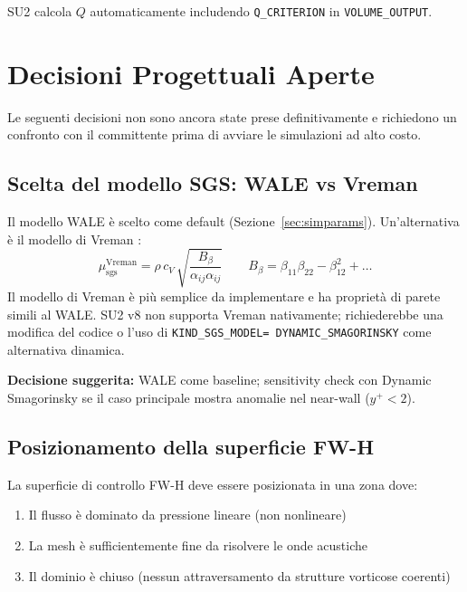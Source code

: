 \documentclass[11pt,a4paper]{article}
\newcommand{\ttcfg}[1]{\texttt{\color{codegray}#1}}
\begin{document}
SU2 calcola $Q$ automaticamente includendo \ttcfg{Q\_CRITERION} in \ttcfg{VOLUME\_OUTPUT}.

\section{Decisioni Progettuali Aperte}
\label{sec:decisioni}

Le seguenti decisioni non sono ancora state prese definitivamente e richiedono un confronto con il committente prima di avviare le simulazioni ad alto costo.

\subsection{Scelta del modello SGS: WALE vs Vreman}

Il modello WALE \cite{Nicoud1999} è scelto come default (Sezione~\ref{sec:simparams}). Un'alternativa è il modello di Vreman \cite{Vreman2004}:
\begin{equation}
  \mu_{\mathrm{sgs}}^{\mathrm{Vreman}} = \rho\,c_V\,\sqrt{\frac{B_\beta}{\alpha_{ij}\alpha_{ij}}}
  \qquad B_\beta = \beta_{11}\beta_{22}-\beta_{12}^2+\ldots
\end{equation}
Il modello di Vreman è più semplice da implementare e ha proprietà di parete simili al WALE. SU2 v8 non supporta Vreman nativamente; richiederebbe una modifica del codice o l'uso di \ttcfg{KIND\_SGS\_MODEL= DYNAMIC\_SMAGORINSKY} come alternativa dinamica.

\textbf{Decisione suggerita:} WALE come baseline; sensitivity check con Dynamic Smagorinsky se il caso principale mostra anomalie nel near-wall ($y^+ < 2$).

\subsection{Posizionamento della superficie FW-H}

La superficie di controllo FW-H deve essere posizionata in una zona dove:
\begin{enumerate}
  \item Il flusso è dominato da pressione lineare (non nonlineare)
  \item La mesh è sufficientemente fine da risolvere le onde acustiche
  \item Il dominio è chiuso (nessun attraversamento da strutture vorticose coerenti)
\end{enumerate}
\end{document}
